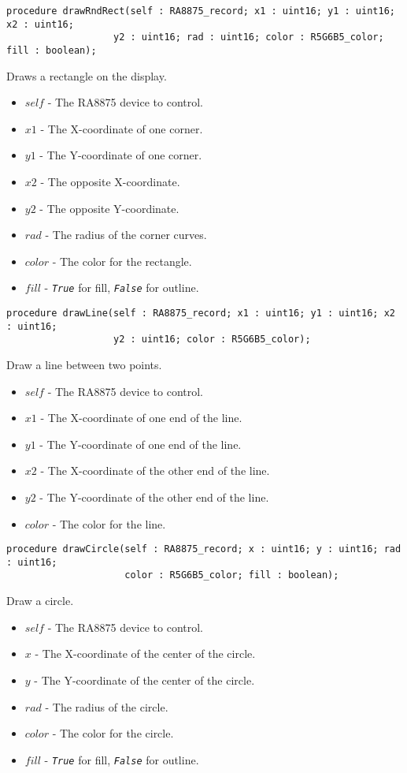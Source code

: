 \documentclass[10pt, openany]{book}
\newcommand{\constant}[1]{\emph{\texttt{#1}}}
\begin{document}
\begin{lstlisting}
procedure drawRndRect(self : RA8875_record; x1 : uint16; y1 : uint16; x2 : uint16;
                   y2 : uint16; rad : uint16; color : R5G6B5_color; fill : boolean);
\end{lstlisting}
Draws a rectangle on the display.
\begin{itemize}
  \item $self$ - The RA8875 device to control.
  \item $x1$ - The X-coordinate of one corner.
  \item $y1$ - The Y-coordinate of one corner.
  \item $x2$ - The opposite X-coordinate.
  \item $y2$ - The opposite Y-coordinate.
  \item $rad$ - The radius of the corner curves.
  \item $color$ - The color for the rectangle.
  \item $fill$ - \constant{True} for fill, \constant{False} for outline.
\end{itemize}

\begin{lstlisting}
procedure drawLine(self : RA8875_record; x1 : uint16; y1 : uint16; x2 : uint16;
                   y2 : uint16; color : R5G6B5_color);
\end{lstlisting}
Draw a line between two points.
\begin{itemize}
  \item $self$ - The RA8875 device to control.
  \item $x1$ - The X-coordinate of one end of the line.
  \item $y1$ - The Y-coordinate of one end of the line.
  \item $x2$ - The X-coordinate of the other end of the line.
  \item $y2$ - The Y-coordinate of the other end of the line.
  \item $color$ - The color for the line.
\end{itemize}

\begin{lstlisting}
procedure drawCircle(self : RA8875_record; x : uint16; y : uint16; rad : uint16;
                     color : R5G6B5_color; fill : boolean);
\end{lstlisting}
Draw a circle.
\begin{itemize}
  \item $self$ - The RA8875 device to control.
  \item $x$ - The X-coordinate of the center of the circle.
  \item $y$ - The Y-coordinate of the center of the circle.
  \item $rad$ - The radius of the circle.
  \item $color$ - The color for the circle.
  \item $fill$ - \constant{True} for fill, \constant{False} for outline.
\end{itemize}
\end{document}
